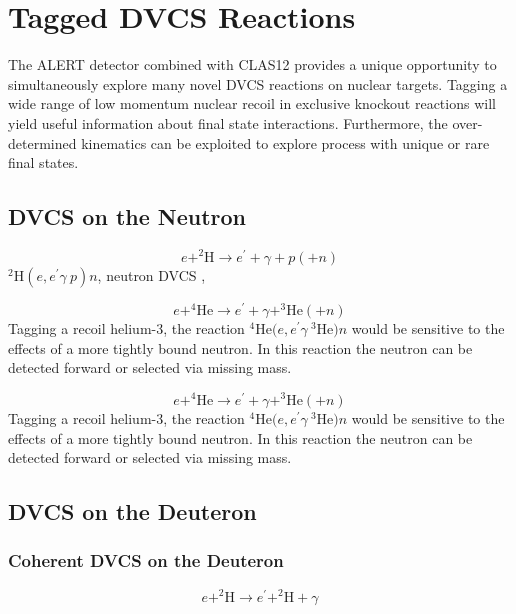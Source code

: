 \section{Tagged DVCS Reactions}

The ALERT detector combined with CLAS12 provides a unique opportunity  to 
simultaneously explore many novel DVCS reactions on nuclear targets. Tagging a 
wide range of low momentum nuclear recoil  in exclusive knockout reactions will 
yield useful information about final state interactions. Furthermore, the 
over-determined kinematics can be exploited to explore process with unique or 
rare final states.


\subsection{DVCS on the Neutron}

\begin{equation}
e + ^2\text{H} \longrightarrow e^{\prime} + \gamma + p (+ n)
\end{equation}
   $^2$H$(e,e^{\prime}\gamma~p)n$,        neutron DVCS ,

\begin{equation}
   e + ^4\text{He} \longrightarrow e^{\prime} + \gamma + ^3\text{He} (+ n)
\end{equation}
Tagging a recoil helium-3, the reaction $^4$He$(e,e^{\prime}\gamma~^3$He$)n$ 
would be sensitive to the effects of a more tightly bound neutron. In this 
reaction the neutron can be detected forward or selected via missing mass.

\begin{equation}
   e + ^4\text{He} \longrightarrow e^{\prime} + \gamma + ^3\text{He} (+ n)
\end{equation}
Tagging a recoil helium-3, the reaction $^4$He$(e,e^{\prime}\gamma~^3$He$)n$ 
would be sensitive to the effects of a more tightly bound neutron. In this 
reaction the neutron can be detected forward or selected via missing mass.

\subsection{DVCS on the Deuteron}

\subsubsection{Coherent DVCS on the Deuteron}

\begin{equation}
   e + ^2\text{H} \longrightarrow e^{\prime} + ^2\text{H} + \gamma 
\end{equation}

